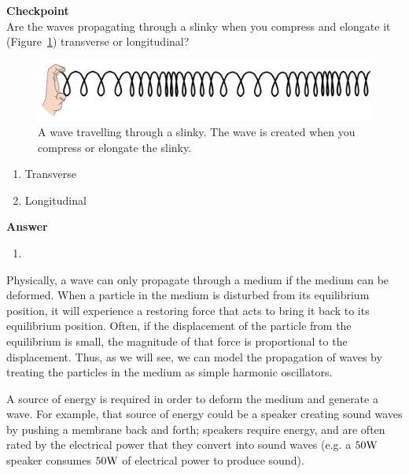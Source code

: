 \begin{framed}
\textbf{Checkpoint}\\
Are the waves propagating through a slinky when you compress and elongate it (Figure~\ref{fig:waves:slinky}) transverse or longitudinal?

\begin{figure}[!htbp]
\centering
\includegraphics[width=0.6\linewidth]{files/slinky-dbf6d8004be443a3d11451ea867b4f98.png}
\caption[]{A wave travelling through a slinky. The wave is created when you compress or elongate the slinky.}
\label{fig:waves:slinky}
\end{figure}

\begin{enumerate}
\item Transverse
\item Longitudinal
\end{enumerate}

\begin{framed}
\textbf{Answer}\\
\begin{enumerate}[resume]
\item
\end{enumerate}
\end{framed}
\end{framed}

Physically, a wave can only propagate through a medium if the medium can be deformed. When a particle in the medium is disturbed from its equilibrium position, it will experience a restoring force that acts to bring it back to its equilibrium position. Often, if the displacement of the particle from the equilibrium is small, the magnitude of that force is proportional to the displacement. Thus, as we will see, we can model the propagation of waves by treating the particles in the medium as simple harmonic oscillators.

A source of energy is required in order to deform the medium and generate a wave. For example, that source of energy could be a speaker creating sound waves by pushing a membrane back and forth; speakers require energy, and are often rated by the electrical power that they convert into sound waves (e.g. a $50 {\rm W}$ speaker consumes $50 {\rm W}$ of electrical power to produce sound).

